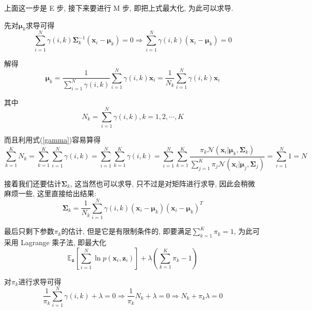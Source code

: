 \documentclass[a4paper,UTF8]{ctexart}
\theoremstyle{plain} \newtheorem{theorem}{定理}[section]
\theoremstyle{plain} \newtheorem{definition}{定义}[section]
\theoremstyle{plain} \newtheorem{lemma}{引理}[section]
\theoremstyle{plain} \newtheorem{proposition}{命题}[section]
\theoremstyle{plain} \newtheorem{example}{例}
\theoremstyle{plain} \newtheorem{remark}{注}
\theoremstyle{plain} \newtheorem{corollary}{推论}[section]
\begin{document}
上面这一步是 E 步, 接下来要进行 M 步, 即把上式最大化, 为此可以求导.

先对$\bm{\mu}_{k}$求导可得
\begin{equation*}
\sum_{i=1}^{N} \gamma(i, k) \bm{\Sigma}_{k}^{-1} (\bm{x}_{i} - \bm{\mu}_{k}) = 0  \Rightarrow \sum_{i=1}^{N} \gamma(i, k) (\bm{x}_{i} - \bm{\mu}_{k}) = 0
\end{equation*}

解得
\begin{equation*}
\bm{\mu}_{k} = \frac{1}{\sum\limits_{i=1}^{N} \gamma(i, k)} \sum_{i=1}^{N} \gamma(i, k) \bm{x}_{i} = \frac{1}{N_{k}} \sum_{i=1}^{N} \gamma(i, k) \bm{x}_{i} 
\end{equation*}

其中
\begin{equation*}
N_{k} = \sum_{i=1}^{N} \gamma(i, k) , k = 1, 2, \cdots, K
\end{equation*}

而且利用式(\ref{gamma})容易算得
\begin{equation*}
\sum_{k=1}^{K} N_{k} = \sum_{k=1}^{K} \sum_{i=1}^{N} \gamma(i,k) = \sum_{i=1}^{N} \sum_{k=1}^{K} \gamma(i,k) = \sum_{i=1}^{N} \sum_{k=1}^{K} \frac{\pi_{k} \mathcal{N}(\bm{x}_{i} | \bm{\mu}_{k},\bm{\Sigma}_{k})}{\sum\limits_{j=1}^{K} \pi_{j} \mathcal{N}(\bm{x}_{i} | \bm{\mu}_{j},\bm{\Sigma}_{j})} = \sum_{i=1}^{N} 1 = N
\end{equation*}

接着我们还要估计$\bm{\Sigma}_{k}$, 这当然也可以求导, 只不过是对矩阵进行求导, 因此会稍微麻烦一些, 这里直接给出结果:
\begin{equation*}
\bm{\Sigma}_{k} = \frac{1}{N_{k}} \sum_{i=1}^{N} \gamma(i,k) (\bm{x}_{i} - \bm{\mu}_{k}) (\bm{x}_{i} - \bm{\mu}_{k})^{T}
\end{equation*}

最后只剩下参数$\pi_{k}$的估计, 但是它是有限制条件的, 即要满足$\sum\limits_{k=1}^{K} \pi_{k} = 1$, 为此可采用 Lagrange 乘子法, 即最大化
\begin{equation*}
\mathbb{E}_{\bm{z}} \left[\sum_{i=1}^{N} \ln p(\bm{x}_{i},\bm{z}_{i})\right] + \lambda \left( \sum_{k=1}^{K} \pi_{k} - 1 \right)
\end{equation*}

对$\pi_{k}$进行求导可得
\begin{equation*}
\frac{1}{\pi_{k}} \sum_{i=1}^{N} \gamma(i, k) + \lambda = 0 \Rightarrow \frac{1}{\pi_{k}} N_{k} + \lambda = 0 \Rightarrow N_{k} + \pi_{k} \lambda = 0
\end{equation*}
\end{document}
